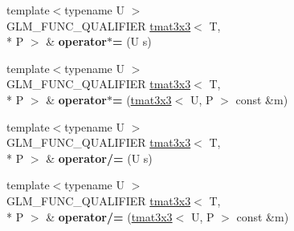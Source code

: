 \begin{DoxyCompactItemize}
\item 
\hypertarget{structglm_1_1detail_1_1tmat3x3_a3340b55021366a2f8bbed8299416bfdb}{{\footnotesize template$<$typename U $>$ }\\G\-L\-M\-\_\-\-F\-U\-N\-C\-\_\-\-Q\-U\-A\-L\-I\-F\-I\-E\-R \hyperlink{structglm_1_1detail_1_1tmat3x3}{tmat3x3}$<$ T, \\*
P $>$ \& {\bfseries operator$\ast$=} (U s)}\label{structglm_1_1detail_1_1tmat3x3_a3340b55021366a2f8bbed8299416bfdb}

\item 
\hypertarget{structglm_1_1detail_1_1tmat3x3_af8ac2b47f30d93952aec87ca734934a5}{{\footnotesize template$<$typename U $>$ }\\G\-L\-M\-\_\-\-F\-U\-N\-C\-\_\-\-Q\-U\-A\-L\-I\-F\-I\-E\-R \hyperlink{structglm_1_1detail_1_1tmat3x3}{tmat3x3}$<$ T, \\*
P $>$ \& {\bfseries operator$\ast$=} (\hyperlink{structglm_1_1detail_1_1tmat3x3}{tmat3x3}$<$ U, P $>$ const \&m)}\label{structglm_1_1detail_1_1tmat3x3_af8ac2b47f30d93952aec87ca734934a5}

\item 
\hypertarget{structglm_1_1detail_1_1tmat3x3_a676cc80fc06dbc44a4eef890452cb12c}{{\footnotesize template$<$typename U $>$ }\\G\-L\-M\-\_\-\-F\-U\-N\-C\-\_\-\-Q\-U\-A\-L\-I\-F\-I\-E\-R \hyperlink{structglm_1_1detail_1_1tmat3x3}{tmat3x3}$<$ T, \\*
P $>$ \& {\bfseries operator/=} (U s)}\label{structglm_1_1detail_1_1tmat3x3_a676cc80fc06dbc44a4eef890452cb12c}

\item 
\hypertarget{structglm_1_1detail_1_1tmat3x3_a7664a2c6d0e4f299e0e53efcbb4dcabf}{{\footnotesize template$<$typename U $>$ }\\G\-L\-M\-\_\-\-F\-U\-N\-C\-\_\-\-Q\-U\-A\-L\-I\-F\-I\-E\-R \hyperlink{structglm_1_1detail_1_1tmat3x3}{tmat3x3}$<$ T, \\*
P $>$ \& {\bfseries operator/=} (\hyperlink{structglm_1_1detail_1_1tmat3x3}{tmat3x3}$<$ U, P $>$ const \&m)}\label{structglm_1_1detail_1_1tmat3x3_a7664a2c6d0e4f299e0e53efcbb4dcabf}

\end{DoxyCompactItemize}
